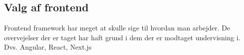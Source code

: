 \subsection{Valg af frontend}
Frontend framework har meget at skulle sige til hvordan man arbejder. De overvejelser der er taget har haft grund i dem
der er modtaget undervisning i. Dvs. Angular, React, Next.js